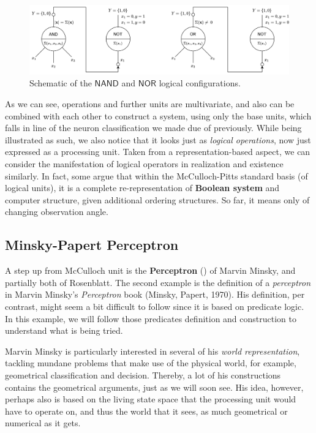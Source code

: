 \begin{figure}[htb]
    \centering
    \includegraphics[width=\textwidth]{img/logic_unit_v3.png}
    \caption{Schematic of the $\mathsf{NAND}$ and $\mathsf{NOR}$ logical configurations.}
\end{figure}

As we can see, operations and further units are multivariate, and also can be combined with each other to construct a system, using only the base units, which falls in line of the neuron classification we made due of previously. While being illustrated as such, we also notice that it looks just as \textit{logical operations}, now just expressed as a processing unit. Taken from a representation-based aspect, we can consider the manifestation of logical operators in realization and existence similarly. In fact, some argue that within the McCulloch-Pitts standard basis (of logical units), it is a complete re-representation of \textbf{Boolean system} and computer structure, given additional ordering structures. So far, it means only of changing observation angle. 

\subsection{Minsky-Papert Perceptron}
A step up from McCulloch unit is the \textbf{Perceptron} (\cite{10.5555/50066}) of Marvin Minsky, and partially both of Rosenblatt. The second example is the definition of a \textit{perceptron} in Marvin Minsky's \textit{Perceptron} book (Minsky, Papert, 1970). His definition, per contrast, might seem a bit difficult to follow since it is based on predicate logic. In this example, we will follow those predicates definition and construction to understand what is being tried. 
\vspace{2mm}

Marvin Minsky is particularly interested in several of his \textit{world representation}, tackling mundane problems that make use of the physical world, for example, geometrical classification and decision. Thereby, a lot of his constructions contains the geometrical arguments, just as we will soon see. His idea, however, perhaps also is based on the living state space that the processing unit would have to operate on, and thus the world that it sees, as much geometrical or numerical as it gets. 

